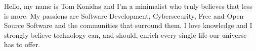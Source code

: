 \documentclass[9pt]{developercv} %
\begin{document}
\vspace{0.5cm}



\begin{minipage}[t]{0.4\textwidth} %
	\vspace{-\baselineskip} %
	
  Hello, my name is Tom Konidas and I'm a minimalist who truly believes that less is more. 
  My passions are Software Development, Cybersecurity, Free and Open Source Software and the communities that surround them.
  I love knowledge and I strongly believe technology can, and should, enrich every single 
  life our universe has to offer.
\end{minipage}
\hfill %
\begin{minipage}[t]{0.5\textwidth} %
	\vspace{-\baselineskip} %
	\begin{barchart}{5.5}
	\end{barchart}
\end{minipage}


\end{document}
